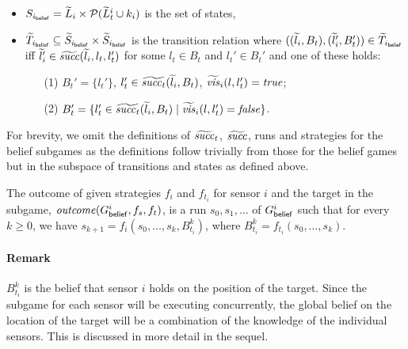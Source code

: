 \begin{itemize}
\item $S_{i_{\mathsf{belief}}} = \widetilde{L}_i \times \mathcal{P}(\widetilde{L}^i_t \cup k_i)$ is the set of states,
\item $\widetilde{T}_{i_{\mathsf{belief}}} \subseteq \widetilde{S}_{i_{\mathsf{belief}}} \times \widetilde{S}_{i_{\mathsf{belief}}}$ is the transition relation where $((\widetilde{l}_i, B_t),(\widetilde{l}_i', B_t')) \in \widetilde{T}_{i_{\mathsf{belief}}}$ iff $\widetilde{l}_i' \in  \widetilde{\mathit{succ}}(\widetilde{l}_i,l_t,l_t')$ for some $l_t \in B_t$ and $l_t' \in B_t'$ and one of these holds:
\begin{itemize}
\item[(1)] $B_t' = \{l_t'\}$, $l_t' \in \widetilde{\mathit{succ}_t}(\widetilde{l}_i,B_t)$, $\widetilde{\mathit{vis}}_i(l,l_t') = \mathit{true}$;
\item[(2)] $B_t' = \{l_t' \in \widetilde{\mathit{succ}_t}(\widetilde{l}_i,B_t)  \mid  \widetilde{\mathit{vis}}_i(l,l_t') = \mathit{false} \}$.
\end{itemize}
\end{itemize}

 For brevity, we omit the definitions of $\widetilde{\mathit{succ}}_t$, $\widetilde{\mathit{succ}}$, runs and strategies for the belief subgames as the definitions follow trivially from those for the belief games but in the subspace of transitions and states as defined above.

The outcome of given strategies $f_{i}$ and $f_{t_i}$ for sensor $i$ and the target in the subgame, $\mathit{outcome}(G^{i}_{\mathsf{belief}},f_s,f_t)$, is a run $s_0,s_1,\ldots$ of $G^{i}_{\mathsf{belief}}$ such that for every $k \geq 0$, we have $s_{k+1} = f_i(s_0,\ldots,s_k,B^k_{t_i})$, where $B^k_{t_i} = f_{t_i}(s_0,\ldots,s_k)$.

\paragraph*{Remark}$B^k_{t_i}$ is the belief that sensor $i$ holds on the position of the target. Since the subgame for each sensor will be executing concurrently, the global belief on the location of the target will be a combination of the knowledge of the individual sensors. This is discussed in more detail in the sequel.

